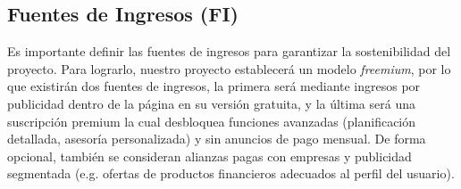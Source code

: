 {}
\subsection*{Fuentes de Ingresos (FI)}

Es importante definir las fuentes de ingresos para garantizar la sostenibilidad del proyecto. Para lograrlo, nuestro proyecto establecerá un modelo \textit{freemium}, por lo que existirán dos fuentes de ingresos, la primera será mediante ingresos por  publicidad dentro de la página en su versión gratuita, y la última será una suscripción premium la cual desbloquea funciones avanzadas (planificación detallada, asesoría personalizada) y sin anuncios de pago mensual. De forma opcional, también se consideran alianzas pagas con empresas y publicidad segmentada (e.g. ofertas de productos financieros adecuados al perfil del usuario).